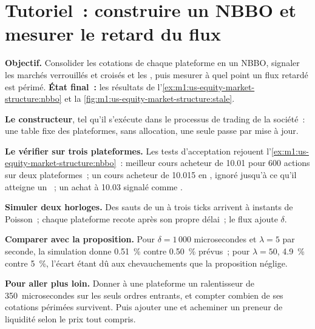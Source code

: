 \section{Tutoriel~: construire un NBBO et mesurer le retard du flux}\label{tut:m1:us-equity-market-structure:nbbo}

\begin{tutorial}
\textbf{Objectif.} Consolider les cotations de chaque plateforme en un NBBO, signaler les marchés verrouillés et
croisés et les , puis mesurer à quel point un flux retardé est périmé.
\textbf{État final~:} les résultats de
l'\cref{ex:m1:us-equity-market-structure:nbbo} et
la \cref{fig:m1:us-equity-market-structure:stale}.
\begin{tutsteps}
\item \textbf{Le constructeur}, tel qu'il s'exécute dans le processus de trading de la société~: une
table fixe des plateformes, sans allocation, une seule passe par mise à jour.
\label{lst:m1:us-equity-market-structure:cpp}
\item \textbf{Le vérifier sur trois plateformes.} Les tests d'acceptation rejouent
l'\cref{ex:m1:us-equity-market-structure:nbbo}~: meilleur cours acheteur de 10.01 pour 600 actions
sur deux plateformes~; un cours acheteur de 10.015 en , ignoré jusqu'à ce qu'il atteigne un ~;
un achat à 10.03 signalé comme .
\item \textbf{Simuler deux horloges.} Des sauts de un à trois ticks arrivent à
instants de Poisson~; chaque plateforme recote après son propre délai~; le flux ajoute
$\delta$.
\label{lst:m1:us-equity-market-structure:stale}
\item \textbf{Comparer avec la proposition.} Pour $\delta = 1\,000$
microsecondes et $\lambda = 5$ par seconde, la simulation donne 0.51~\%
contre 0.50~\% prévus~; pour $\lambda = 50$, 4.9~\% contre 5~\%, l'écart
étant dû aux chevauchements que la proposition néglige.
\end{tutsteps}
\textbf{Pour aller plus loin.} Donner à une plateforme un ralentisseur de 350~microsecondes sur
les seuls ordres entrants, et compter combien de ses cotations périmées survivent. Puis
ajouter une  et acheminer un preneur de liquidité selon le prix tout compris.
\end{tutorial}


